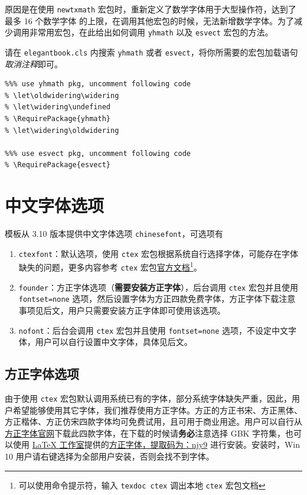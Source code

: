 \documentclass[lang=cn,newtx,10pt,scheme=chinese,pad,twocol]{zznote}
\begin{document}
原因是在使用 \lstinline{newtxmath} 宏包时，重新定义了数学字体用于大型操作符，达到了 {\heiti 最多 16 个数学字体} 的上限，在调用其他宏包的时候，无法新增数学字体。为了减少调用非常用宏包，在此给出如何调用 \lstinline{yhmath} 以及 \lstinline{esvect} 宏包的方法。

请在 \lstinline{elegantbook.cls} 内搜索 \lstinline{yhmath} 或者 \lstinline{esvect}，将你所需要的宏包加载语句\textit{取消注释}即可。
\begin{lstlisting}
%%% use yhmath pkg, uncomment following code
% \let\oldwidering\widering
% \let\widering\undefined
% \RequirePackage{yhmath}
% \let\widering\oldwidering

%%% use esvect pkg, uncomment following code
% \RequirePackage{esvect}
\end{lstlisting}

\section{中文字体选项}
模板从 3.10 版本提供中文字体选项 \lstinline{chinesefont}，可选项有
\begin{enumerate}
	\item \lstinline{ctexfont}：默认选项，使用 \lstinline{ctex} 宏包根据系统自行选择字体，可能存在字体缺失的问题，更多内容参考 \lstinline{ctex} 宏包\href{https://ctan.org/pkg/ctex}{官方文档}\footnote{可以使用命令提示符，输入 \lstinline{texdoc ctex} 调出本地 \lstinline{ctex} 宏包文档}。
	\item \lstinline{founder}：方正字体选项（\textbf{需要安装方正字体}），后台调用 \lstinline{ctex} 宏包并且使用 \lstinline{fontset=none} 选项，然后设置字体为方正四款免费字体，方正字体下载注意事项见后文，用户只需要安装方正字体即可使用该选项。
	\item \lstinline{nofont}：后台会调用 \lstinline{ctex} 宏包并且使用 \lstinline{fontset=none} 选项，不设定中文字体，用户可以自行设置中文字体，具体见后文。
\end{enumerate}

\subsection{方正字体选项}
由于使用 \lstinline{ctex} 宏包默认调用系统已有的字体，部分系统字体缺失严重，因此，用户希望能够使用其它字体，我们推荐使用方正字体。方正的{\songti 方正书宋}、{\heiti 方正黑体}、{\kaishu 方正楷体}、{\fangsong 方正仿宋}四款字体均可免费试用，且可用于商业用途。用户可以自行从\href{http://www.foundertype.com/}{方正字体官网}下载此四款字体，在下载的时候请\textbf{务必}注意选择 GBK 字符集，也可以使用 \href{https://www.latexstudio.net/}{\LaTeX{} 工作室}提供的\href{https://pan.baidu.com/s/1BgbQM7LoinY7m8yeP25Y7Q}{方正字体，提取码为：njy9} 进行安装。安装时，{\kaishu Win 10 用户请右键选择为全部用户安装，否则会找不到字体。}
\end{document}
